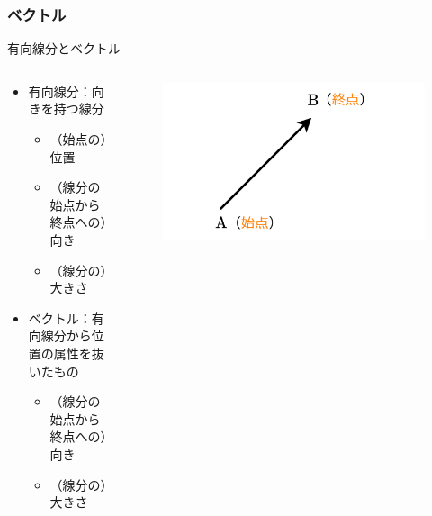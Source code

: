 \documentclass[dvipdfmx,aspectratio=169]{beamer}
\begin{document}
	\subsubsection{ベクトル}
	\begin{frame}{有向線分とベクトル}
		\begin{columns}
			\begin{column}{0.5\linewidth}
				\begin{itemize}
					\item \alert{有向線分}：向きを持つ線分
					\begin{itemize}
						\item （始点の）\alert{位置}
						\item （線分の始点から終点への）\alert{向き}
						\item （線分の）\alert{大きさ}
					\end{itemize}
					\item \alert{ベクトル}：有向線分から位置の属性を抜いたもの
					\begin{itemize}
						\item （線分の始点から終点への）\alert{向き}
						\item （線分の）\alert{大きさ}
					\end{itemize}
				\end{itemize}
			\end{column}
			\begin{column}{0.5\linewidth}
				\begin{figure}
					\centering
					\includegraphics[width=0.9\linewidth]{img/directed-line-segment-and-vector}
				\end{figure}
			\end{column}
		\end{columns}
	\end{frame}
\end{document}

